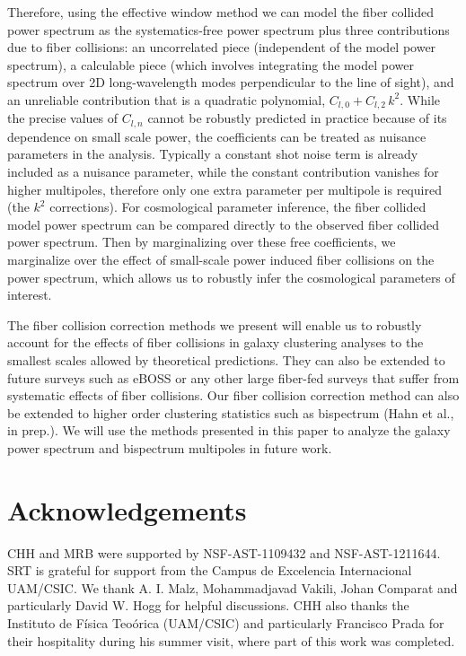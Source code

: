 Therefore, using the effective window method we can model the fiber collided power 
spectrum as the systematics-free  power spectrum plus three contributions due to  
fiber collisions: an uncorrelated piece (independent of the model power spectrum), a calculable piece (which involves integrating the model power spectrum over 2D long-wavelength modes perpendicular to the line of sight), and an unreliable contribution that is a quadratic polynomial, $C_{l,0} + C_{l,2}\, k^2$. 
While the precise values of $C_{l, n}$ cannot be robustly predicted in practice 
because of its dependence on small scale power, the coefficients 
can be treated as nuisance parameters in the analysis. Typically a constant shot 
noise term is already included as a nuisance parameter, while the constant contribution vanishes for higher multipoles, therefore only one extra parameter 
per multipole is required (the $k^2$ corrections). For cosmological parameter inference, the fiber collided model power spectrum 
can be compared directly to the observed fiber 
collided power spectrum. Then by marginalizing over these free coefficients, we marginalize 
over the effect of small-scale power induced fiber collisions on the power spectrum, which allows us to robustly 
infer the cosmological parameters of interest.

The fiber collision correction methods we present will enable us to robustly 
account for the effects of fiber collisions in galaxy clustering analyses 
to the smallest scales allowed by theoretical predictions. They can also be extended to 
future surveys such as eBOSS  or any other large fiber-fed 
surveys that suffer from systematic effects of fiber collisions. Our fiber
collision correction method can also be extended to higher order clustering 
statistics such as bispectrum (Hahn et al., in prep.). We will use the methods 
presented in this paper to analyze the galaxy power spectrum and bispectrum 
multipoles in future work.

\bigskip

\section*{Acknowledgements}
CHH and MRB were supported by NSF-AST-1109432 and NSF-AST-1211644.
SRT is grateful for support from the Campus de Excelencia Internacional UAM/CSIC.
We thank A. I. Malz, Mohammadjavad Vakili, Johan Comparat and particularly 
David W. Hogg for helpful discussions. CHH also thanks the Instituto 
de F\'{i}sica Teo\'{o}rica (UAM/CSIC) and 
particularly Francisco Prada for their hospitality during his summer 
visit, where part of this work was completed.

